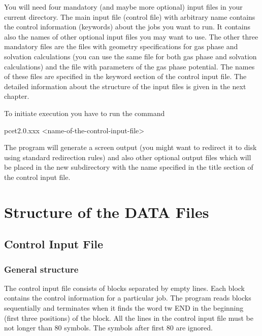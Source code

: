 \documentclass[oneside,11pt,openany]{book}
\newcommand{\tw}{\ttfamily}
\begin{document}
You will need four mandatory (and maybe more optional) input files
in your current directory. The main input file (control file)
with arbitrary name contains the control information
(keywords) about the jobs you want to run. It contains
also the names of other optional input files you may
want to use. The other three mandatory files are the files
with geometry specifications for gas phase and solvation
calculations (you can use the same file for both gas phase
and solvation calculations) and the file with parameters
of the gas phase potential. The names of these files are
specified in the keyword section of the control input file.
The detailed information about the structure of the input
files is given in the next chapter.

To initiate execution you have to run the command

\begin{description}
\item {\tw pcet2.0.xxx <name-of-the-control-input-file>}
\end{description}

The program will generate a screen output (you might want to
redirect it to disk using standard redirection rules) and
also other optional output files which will be placed
in the new subdirectory with the name specified in the title
section of the control input file.


\chapter{Structure of the DATA Files}

\section{Control Input File}

\subsection{General structure}
The control input file consists of blocks separated by
empty lines. Each block contains the control information
for a particular job. The program reads blocks sequentially
and terminates when it finds the word {tw END} in the
beginning (first three positions) of the block. All the
lines in the control input file must be not longer
than 80 symbols. The symbols after first 80 are ignored.
\end{document}
